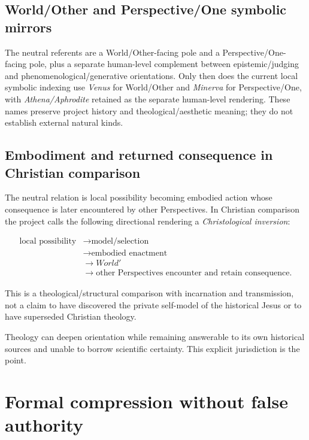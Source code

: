 \documentclass[11pt]{article}
\begin{document}
\subsection{World/Other and Perspective/One symbolic mirrors}

The neutral referents are a World/Other-facing pole and a Perspective/One-facing pole, plus a separate human-level complement between epistemic/judging and phenomenological/generative orientations. Only then does the current local symbolic indexing use \emph{Venus} for World/Other and \emph{Minerva} for Perspective/One, with \emph{Athena/Aphrodite} retained as the separate human-level rendering. These names preserve project history and theological/aesthetic meaning; they do not establish external natural kinds.

\subsection{Embodiment and returned consequence in Christian comparison}

The neutral relation is local possibility becoming embodied action whose consequence is later encountered by other Perspectives. In Christian comparison the project calls the following directional rendering a \emph{Christological inversion}:

\begin{equation}
\begin{aligned}
\text{local possibility}&\rightarrow\text{model/selection}\\
&\rightarrow\text{embodied enactment}\\
&\rightarrow World'\\
&\rightarrow\text{other Perspectives encounter and retain consequence}.
\end{aligned}
\end{equation}

This is a theological/structural comparison with incarnation and transmission, not a claim to have discovered the private self-model of the historical Jesus or to have superseded Christian theology.

Theology can deepen orientation while remaining answerable to its own historical sources and unable to borrow scientific certainty. This explicit jurisdiction is the point.

\section{Formal compression without false authority}
\end{document}
